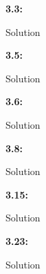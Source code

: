 \begin{homeworkProblem}

	\textbf{3.3:}

	\solution

	Solution

\end{homeworkProblem}

\begin{homeworkProblem}

	\textbf{3.5:}

	\solution

	Solution

\end{homeworkProblem}

\begin{homeworkProblem}

	\textbf{3.6:}

	\solution

	Solution

\end{homeworkProblem}

\begin{homeworkProblem}

	\textbf{3.8:}

	\solution

	Solution

\end{homeworkProblem}

\begin{homeworkProblem}

	\textbf{3.15:}

	\solution

	Solution

\end{homeworkProblem}

\begin{homeworkProblem}

	\textbf{3.23:}

	\solution

	Solution

\end{homeworkProblem}


